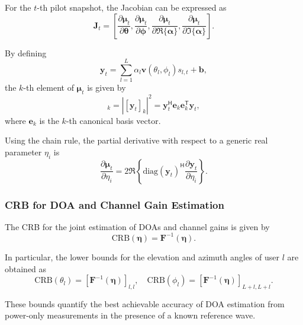 \documentclass[journal]{IEEEtran}
\begin{document}
For the $t$-th pilot snapshot, the Jacobian can be expressed as
\begin{equation}
\mathbf{J}_t
=
\left[
\frac{\partial \boldsymbol{\mu}_t}{\partial \boldsymbol{\theta}},
\frac{\partial \boldsymbol{\mu}_t}{\partial \boldsymbol{\phi}},
\frac{\partial \boldsymbol{\mu}_t}{\partial \Re\{\boldsymbol{\alpha}\}},
\frac{\partial \boldsymbol{\mu}_t}{\partial \Im\{\boldsymbol{\alpha}\}}
\right].
\end{equation}

By defining
\begin{equation}
\mathbf{y}_t
=
\sum_{l=1}^{L}
\alpha_l
\mathbf{v}(\theta_l,\phi_l)
s_{l,t}
+
\mathbf{b},
\end{equation}
the $k$-th element of $\boldsymbol{\mu}_t$ is given by
\begin{equation}
[\boldsymbol{\mu}_t]_k
=
|[\mathbf{y}_t]_k|^2
=
\mathbf{y}_t^{\mathsf{H}}
\mathbf{e}_k
\mathbf{e}_k^{\mathsf{T}}
\mathbf{y}_t,
\end{equation}
where $\mathbf{e}_k$ is the $k$-th canonical basis vector.

Using the chain rule, the partial derivative with respect to a generic real
parameter $\eta_i$ is
\begin{equation}
\frac{\partial \boldsymbol{\mu}_t}{\partial \eta_i}
=
2 \Re
\left\{
\mathrm{diag}(\mathbf{y}_t)^{\mathsf{H}}
\frac{\partial \mathbf{y}_t}{\partial \eta_i}
\right\}.
\label{eq:mu_derivative}
\end{equation}

\subsubsection{CRB for DOA and Channel Gain Estimation}

The CRB for the joint estimation of DOAs and channel gains is given by
\begin{equation}
\mathrm{CRB}(\boldsymbol{\eta})
=
\mathbf{F}^{-1}(\boldsymbol{\eta}).
\end{equation}

In particular, the lower bounds for the elevation and azimuth angles of user $l$
are obtained as
\begin{equation}
\mathrm{CRB}(\theta_l)
=
\left[
\mathbf{F}^{-1}(\boldsymbol{\eta})
\right]_{l,l},
\quad
\mathrm{CRB}(\phi_l)
=
\left[
\mathbf{F}^{-1}(\boldsymbol{\eta})
\right]_{L+l,L+l}.
\end{equation}

These bounds quantify the best achievable accuracy of DOA estimation from
power-only measurements in the presence of a known reference wave.
\end{document}
